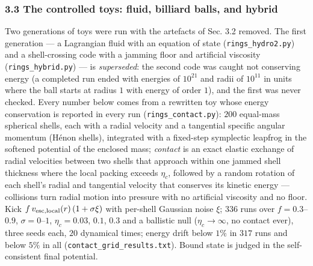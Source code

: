 \documentclass[
  11pt,
]{article}
\begin{document}
\hypertarget{the-controlled-toys-fluid-billiard-balls-and-hybrid}{%
\subsubsection{\texorpdfstring{\textbf{3.3 The controlled toys: fluid,
billiard balls, and
hybrid}}{3.3 The controlled toys: fluid, billiard balls, and hybrid}}\label{the-controlled-toys-fluid-billiard-balls-and-hybrid}}

Two generations of toys were run with the artefacts of Sec. 3.2 removed.
The first generation --- a Lagrangian fluid with an equation of state
(\texttt{rings\_hydro2.py}) and a shell-crossing code with a jamming
floor and artificial viscosity (\texttt{rings\_hybrid.py}) --- is
\emph{superseded}: the second code was caught not conserving energy (a
completed run ended with energies of \(10^{21}\) and radii of
\(10^{11}\) in units where the ball starts at radius \(1\) with energy
of order \(1\)), and the first was never checked. Every number below
comes from a rewritten toy whose energy conservation is reported in
every run (\texttt{rings\_contact.py}): \(200\) equal-mass spherical
shells, each with a radial velocity and a tangential specific angular
momentum (Hénon shells), integrated with a fixed-step symplectic
leapfrog in the softened potential of the enclosed mass; \emph{contact}
is an exact elastic exchange of radial velocities between two shells
that approach within one jammed shell thickness where the local packing
exceeds \(\eta_c\), followed by a random rotation of each shell's radial
and tangential velocity that conserves its kinetic energy --- collisions
turn radial motion into pressure with no artificial viscosity and no
floor. Kick \(f\,v_{\rm esc,local}(r)\,(1+\sigma\xi)\) with per-shell
Gaussian noise \(\xi\); \(336\) runs over \(f = 0.3\)--\(0.9\),
\(\sigma = 0\)--\(1\), \(\eta_c = 0.03\), \(0.1\), \(0.3\) and a
ballistic null (\(\eta_c \to \infty\), no contact ever), three seeds
each, \(20\) dynamical times; energy drift below \(1\%\) in \(317\) runs
and below \(5\%\) in all (\texttt{contact\_grid\_results.txt}). Bound
state is judged in the self-consistent final potential.
\end{document}
